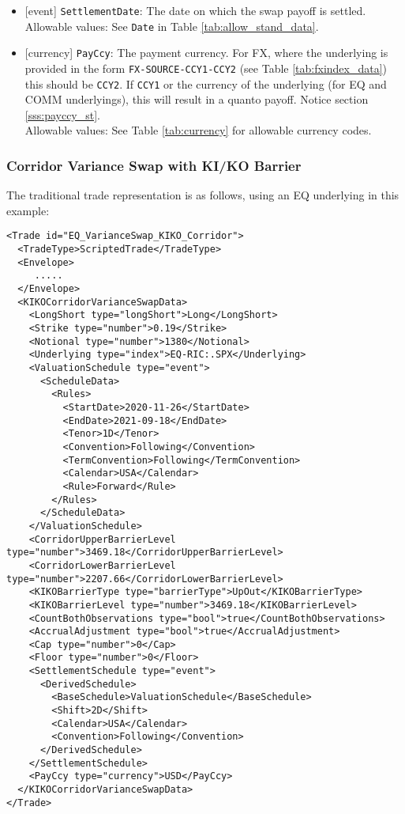 \begin{itemize}
  \item{}[event] \lstinline!SettlementDate!: The date on which the swap payoff is settled. \\
  Allowable values: See \lstinline!Date! in Table \ref{tab:allow_stand_data}.
  \item{}[currency] \lstinline!PayCcy!: The payment currency. For FX, where the underlying is provided
      in the form \lstinline!FX-SOURCE-CCY1-CCY2! (see Table \ref{tab:fxindex_data}) this should
      be \lstinline!CCY2!. If \lstinline!CCY1! or the currency of the underlying (for EQ and
      COMM underlyings), this will result in a quanto payoff. Notice section \ref{sss:payccy_st}. \\
        Allowable values: See Table \ref{tab:currency}  for allowable currency codes.
\end{itemize}

\subsubsection*{Corridor Variance Swap with KI/KO Barrier}

The traditional trade representation is as follows, using an EQ underlying in this example:

\begin{verbatim}
<Trade id="EQ_VarianceSwap_KIKO_Corridor">
  <TradeType>ScriptedTrade</TradeType>
  <Envelope>
     .....
  </Envelope>
  <KIKOCorridorVarianceSwapData>
    <LongShort type="longShort">Long</LongShort>
    <Strike type="number">0.19</Strike>
    <Notional type="number">1380</Notional>
    <Underlying type="index">EQ-RIC:.SPX</Underlying>
    <ValuationSchedule type="event">
      <ScheduleData>
        <Rules>
          <StartDate>2020-11-26</StartDate>
          <EndDate>2021-09-18</EndDate>
          <Tenor>1D</Tenor>
          <Convention>Following</Convention>
          <TermConvention>Following</TermConvention>
          <Calendar>USA</Calendar>
          <Rule>Forward</Rule>
        </Rules>
      </ScheduleData>
    </ValuationSchedule>
    <CorridorUpperBarrierLevel type="number">3469.18</CorridorUpperBarrierLevel>
    <CorridorLowerBarrierLevel type="number">2207.66</CorridorLowerBarrierLevel>
    <KIKOBarrierType type="barrierType">UpOut</KIKOBarrierType>
    <KIKOBarrierLevel type="number">3469.18</KIKOBarrierLevel>
    <CountBothObservations type="bool">true</CountBothObservations>
    <AccrualAdjustment type="bool">true</AccrualAdjustment>
    <Cap type="number">0</Cap>
    <Floor type="number">0</Floor>
    <SettlementSchedule type="event">
      <DerivedSchedule>
        <BaseSchedule>ValuationSchedule</BaseSchedule>
        <Shift>2D</Shift>
        <Calendar>USA</Calendar>
        <Convention>Following</Convention>
      </DerivedSchedule>
    </SettlementSchedule>
    <PayCcy type="currency">USD</PayCcy>
  </KIKOCorridorVarianceSwapData>
</Trade>
\end{verbatim}

